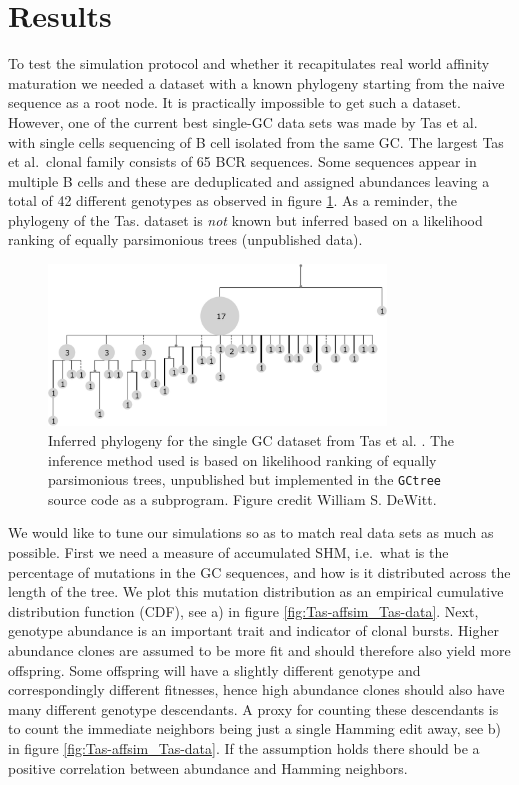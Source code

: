 \section{Results}
To test the simulation protocol and whether it recapitulates real world affinity maturation we needed a dataset with a known phylogeny starting from the naive sequence as a root node.
It is practically impossible to get such a dataset.
However, one of the current best single-GC data sets was made by Tas et al.\ \cite{tas2016visualizing} with single cells sequencing of B cell isolated from the same GC.
The largest Tas et al.\ clonal family consists of 65 BCR sequences.
Some sequences appear in multiple B cells and these are deduplicated and assigned abundances leaving a total of 42 different genotypes as observed in figure \ref{fig:Tas_tree}.
As a reminder, the phylogeny of the Tas. dataset is \textit{not} known but inferred based on a likelihood ranking of equally parsimonious trees (unpublished data).

\begin{figure}[!ht]
    \centering
    \includegraphics[width=0.8\textwidth]{figures/Tas_tree.pdf}
    \caption{
        \label{fig:Tas_tree}
        Inferred phylogeny for the single GC dataset from Tas et al. \cite{tas2016visualizing}.
        The inference method used is based on likelihood ranking of equally parsimonious trees, unpublished but implemented in the \texttt{GCtree} source code as a subprogram.
        Figure credit William S. DeWitt.
    }
\end{figure}

We would like to tune our simulations so as to match real data sets as much as possible.
First we need a measure of accumulated SHM, i.e.\ what is the percentage of mutations in the GC sequences, and how is it distributed across the length of the tree.
We plot this mutation distribution as an empirical cumulative distribution function (CDF), see a) in figure \ref{fig:Tas-affsim_Tas-data}.
Next, genotype abundance is an important trait and indicator of clonal bursts.
Higher abundance clones are assumed to be more fit and should therefore also yield more offspring.
Some offspring will have a slightly different genotype and correspondingly different fitnesses, hence high abundance clones should also have many different genotype descendants.
A proxy for counting these descendants is to count the immediate neighbors being just a single Hamming edit away, see b) in figure \ref{fig:Tas-affsim_Tas-data}.
If the assumption holds there should be a positive correlation between abundance and Hamming neighbors.

